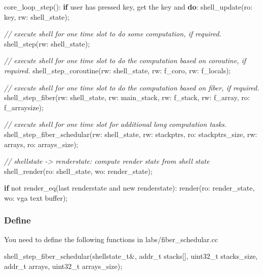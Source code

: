 \documentclass[]{book}
\newenvironment{Shaded}{}{}
\newcommand{\KeywordTok}[1]{\textbf{{#1}}}
\newcommand{\DataTypeTok}[1]{\textcolor[rgb]{0.50,0.00,0.00}{{#1}}}
\newcommand{\CommentTok}[1]{\textcolor[rgb]{0.50,0.50,0.50}{\textit{{#1}}}}
\newcommand{\NormalTok}[1]{{#1}}
\begin{document}
\begin{Shaded}
\begin{Highlighting}[]
        \NormalTok{core_loop_step():}
            \KeywordTok{if} \NormalTok{user has pressed key, get the key and }\KeywordTok{do}\NormalTok{:}
                \NormalTok{shell_update(ro: key, rw: shell_state);}

            \CommentTok{// execute shell for one time slot to do some computation, if required.}
            \NormalTok{shell_step(rw: shell_state);}

            \CommentTok{// execute shell for one time slot to do the computation based on coroutine, if required.}
            \NormalTok{shell_step_coroutine(rw: shell_state, rw: f_coro, rw: f_locals);}

            \CommentTok{// execute shell for one time slot to do the computation based on fiber, if required.}
            \NormalTok{shell_step_fiber(rw: shell_state, rw: main_stack, rw: f_stack, rw: f_array, ro: f_arraysize);}

            \CommentTok{// execute shell for one time slot for additional long computation tasks.}
            \NormalTok{shell_step_fiber_schedular(rw: shell_state, rw: stackptrs, ro: stackptrs_size, rw: arrays, ro: arrays_size);}

            \CommentTok{// shellstate -> renderstate: compute render state from shell state}
            \NormalTok{shell_render(ro: shell_state, wo: render_state);}

            \KeywordTok{if} \NormalTok{not render_eq(last renderstate and new renderstate):}
                \NormalTok{render(ro: render_state, wo: vga text buffer);}
\end{Highlighting}
\end{Shaded}

\subsubsection*{Define}\label{define-6}

You need to define the following functions in labs/fiber\_schedular.cc

\begin{Shaded}
\begin{Highlighting}[]
   \NormalTok{shell_step_fiber_schedular(shellstate_t&, addr_t stacks[], }\DataTypeTok{uint32_t} \NormalTok{stacks_size, addr_t arrays, }\DataTypeTok{uint32_t} \NormalTok{arrays_size);}
\end{Highlighting}
\end{Shaded}
\end{document}

